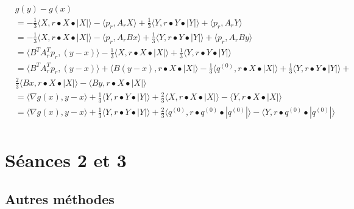 \documentclass[12pt, letterpaper]{article}
\begin{document}
\begin{align*}
&g(y) - g(x) \\
&= -\frac{1}{3} \langle X,r \bullet X \bullet |X|\rangle  - \langle p_r,A_rX\rangle  + \frac{1}{3}\langle Y,r \bullet Y \bullet |Y|\rangle  + \langle p_r,A_rY\rangle   \\
&= -\frac{1}{3} \langle X,r \bullet X \bullet |X|\rangle  - \langle p_r,A_rBx\rangle  + \frac{1}{3}\langle Y,r \bullet Y \bullet |Y|\rangle  + \langle p_r,A_rBy\rangle   \\
&= \langle B^TA_r^Tp_r,(y - x)\rangle -\frac{1}{3} \langle X,r \bullet X \bullet |X|\rangle + \frac{1}{3}\langle Y,r \bullet Y \bullet |Y|\rangle \\
&= \langle B^TA_r^Tp_r,(y - x)\rangle + \langle B(y-x),r \bullet X \bullet |X|\rangle - \frac{1}{3}\langle q^{(0)},r \bullet X \bullet |X|\rangle + \frac{1}{3}\langle Y,r \bullet Y \bullet |Y|\rangle + \\
&\frac{2}{3} \langle Bx,r \bullet X \bullet |X|\rangle -  \langle By,r \bullet X \bullet |X|\rangle\\
&=  \langle \nabla g(x),y-x\rangle + \frac{1}{3}\langle Y,r \bullet Y \bullet |Y|\rangle + \frac{2}{3} \langle X,r \bullet X \bullet |X|\rangle -  \langle Y,r \bullet X \bullet |X|\rangle \\
&= \langle \nabla g(x),y-x\rangle + \frac{1}{3}\langle Y,r \bullet Y \bullet |Y|\rangle + \frac{2}{3} \langle q^{(0)},r \bullet q^{(0)} \bullet |q^{(0)}|\rangle -  \langle Y,r \bullet q^{(0)} \bullet |q^{(0)}|\rangle \\
\end{align*}

\section*{Séances 2 et 3}

\subsection*{Autres méthodes}
\end{document}
